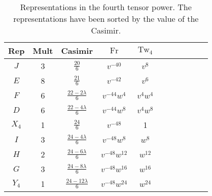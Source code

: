 \documentclass[12pt]{amsart}
\DeclareMathOperator{\Tw}{Tw}
\DeclareMathOperator{\Fr}{Fr}
\begin{document}
\begin{table}
  \centering
  \medskip
  \begin{tabular}{ccccccccccc}
    \toprule
    Rep & Mult & Casimir & $\Fr$ & $\Tw_4$ \\ \midrule
    $J$ & 3 & $\frac{20}{6}$ & $v^{-40}$ & $v^8$ \\[3pt]
    $E$ & 8 & $\frac{21}{6}$ & $v^{-42}$ & $v^6$ \\[3pt]
    $F$ & 6 & $\frac{22 - 2\lambda}{6}$ & $v^{-44}w^4$ & $v^4w^4$ \\[3pt]
    $D$ & 6 & $\frac{22 - 4\lambda}{6}$ & $v^{-44}w^8$ & $v^4w^8$ \\[3pt]
    $X_4$ & 1 & $\frac{24}{6}$ & $v^{-48}$ & 1\\[3pt]
    $I$ & 3 & $\frac{24 - 4\lambda}{6}$ & $v^{-48}w^8$ & $w^8$\\[3pt]
    $H$ & 2 & $\frac{24 - 6\lambda}{6}$ & $v^{-48}w^{12}$ & $w^{12}$\\[3pt]
    $G$ & 3 & $\frac{24 - 8\lambda}{6}$ & $v^{-48}w^{16}$ & $w^{16}$ \\[3pt]
    $Y_4$ & 1 & $\frac{24 - 12\lambda}{6}$ & $v^{-48}w^{24}$ & $w^{24}$ \\[3pt]
    \bottomrule
  \end{tabular}
  \medskip
  \caption{Representations in the fourth tensor power. The
    representations have been sorted by the value of the Casimir.}
  \label{tab:fourth-tensor}
\end{table}



\end{document}
